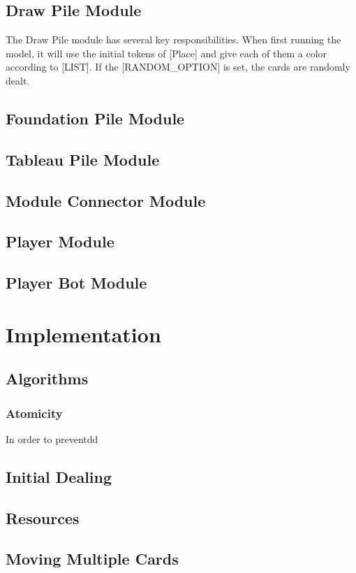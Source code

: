 \documentclass[runningheads,a4paper]{llncs}
\begin{document}
\subsection{Draw Pile Module}
The Draw Pile module has several key responsibilities. When first running the model, it will use the initial tokens of [Place] and give each of them a color according to [LIST]. If the [RANDOM_OPTION] is set, the cards are randomly dealt.
\subsection{Foundation Pile Module}
\subsection{Tableau Pile Module}
\subsection{Module Connector Module}
\subsection{Player Module}
\subsection{Player Bot Module}





\section{Implementation}
\label{sec:3_implementation}
\subsection{Algorithms}
\subsubsection{Atomicity}
In order to preventdd
\subsection{Initial Dealing}
\subsection{Resources}
\subsection{Moving Multiple Cards}
\end{document}

